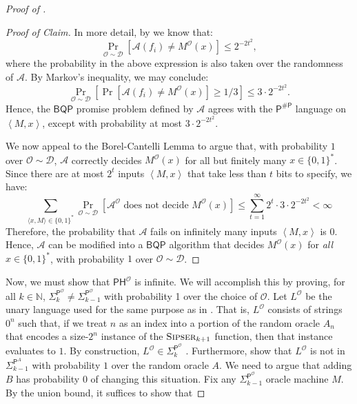 \documentclass[11pt]{article}%
\newcommand{\Naturals}{\mathbb{N}}
\newcommand{\Sipser}{\normalfont\textsc{Sipser}}
\begin{document}
\begin{proof}[Proof of ]
\begin{proof}[Proof of Claim]
In more detail, by  we know that:
\[
\Pr_{\mathcal{O} \sim \mathcal{D}} \left[\mathcal{A}(f_i) \neq M^\mathcal{O}(x)\right] \le 2^{-2t^2},
\]
where the probability in the above expression is also taken over the randomness of $\mathcal{A}$. By Markov's inequality, we may conclude:
\[
\Pr_{\mathcal{O} \sim \mathcal{D}} \left[\Pr\left[\mathcal{A}(f_i) \neq M^\mathcal{O}(x)\right] \ge 1/3\right] \le 3 \cdot 2^{-2t^2}.
\]
Hence, the $\mathsf{BQP}$ promise problem defined by $\mathcal{A}$ agrees with the $\mathsf{P}^{\mathsf{\# P}}$ language on $\left<M,x\right>$, except with probability at most $3 \cdot 2^{-2t^2}$.

We now appeal to the Borel-Cantelli Lemma to argue that, with probability $1$ over $\mathcal{O} \sim \mathcal{D}$, $\mathcal{A}$ correctly decides $M^\mathcal{O}(x)$ for all but finitely many $x \in \{0,1\}^*$. Since there are at most $2^t$ inputs $\left<M,x\right>$ that take less than $t$ bits to specify, we have:
\[
\sum_{\langle x, M \rangle \in \{0,1\}^*} \Pr_{\mathcal{O} \sim \mathcal{D}}\left[\mathcal{A}^\mathcal{O} \text{ does not decide } M^\mathcal{O}(x)\right] \le \sum_{t=1}^{\infty} 2^t \cdot 3 \cdot 2^{-2t^2} < \infty
\]
Therefore, the probability that $\mathcal{A}$ fails on infinitely many inputs $\left<M,x\right>$ is $0$. Hence, $\mathcal{A}$ can be modified into a $\mathsf{BQP}$ algorithm that decides $M^\mathcal{O}(x)$ for \textit{all} $x \in \{0,1\}^*$, with probability $1$ over $\mathcal{O} \sim \mathcal{D}$.
\end{proof}

Now, we must show that $\mathsf{PH}^\mathcal{O}$ is infinite. We will accomplish this by proving, for all $k \in \Naturals$, $\mathsf{\Sigma}_{k}^{\mathsf{P}^\mathcal{O}}\neq\mathsf{\Sigma}_{k-1}^{\mathsf{P}^\mathcal{O}}$ with probability 1 over the choice of $\mathcal{O}$. Let $L^\mathcal{O}$ be the unary language used for the same purpose as in \cite{RST15,HRST17}. That is, $L^\mathcal{O}$ consists of strings $0^n$ such that, if we treat $n$ as an index into a portion of the random oracle $A_n$ that encodes a size-$2^n$ instance of the $\Sipser_{k+1}$ function, then that instance evaluates to $1$. By construction, $L^\mathcal{O} \in \mathsf{\Sigma}_{k}^{\mathsf{P}^\mathcal{O}}$ \cite{RST15,HRST17}. Furthermore, \cite{RST15,HRST17} show that $L^\mathcal{O}$ is not in $\mathsf{\Sigma}_{k-1}^{\mathsf{P}^A}$ with probability $1$ over the random oracle $A$. We need to argue that adding $B$ has probability $0$ of changing this situation. Fix any $\mathsf{\Sigma}_{k-1}^{\mathsf{P}^\mathcal{O}}$ oracle machine $M$. By the union bound, it suffices to show that


\end{proof}
\end{document}
